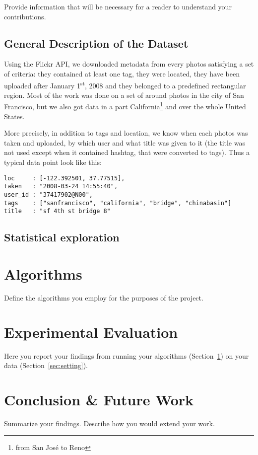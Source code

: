 Provide information that will be necessary for a reader to understand your contributions.

\subsection{General Description of the Dataset}

Using the Flickr API, we downloaded metadata from every photos satisfying a
set of criteria: they contained at least one tag, they were located, they have
been uploaded after January 1\textsuperscript{st}, 2008 and they belonged to a
predefined rectangular region. Most of the work was done on a set of around
 photos in the city of San Francisco, but we also got data in
a part California\footnote{from San José to Reno} and over the whole United
States.

More precisely, in addition to tags and location, we know when each photos was
taken and uploaded, by which user and what title was given to it (the title
was not used except when it contained hashtag, that were converted to tags).
Thus a typical data point look like this:

\vspace{\baselineskip}
{\centering\begin{minipage}{0.7\linewidth}
  \begin{Verbatim}[frame=none, gobble=0]
loc     : [-122.392501, 37.77515],
taken   : "2008-03-24 14:55:40",
user_id : "37417902@N00",
tags    : ["sanfrancisco", "california", "bridge", "chinabasin"]
title   : "sf 4th st bridge 8"
  \end{Verbatim}
\end{minipage}\par}



\subsection{Statistical exploration}

\section{Algorithms}
\label{sec:algorithms}

Define the algorithms you employ for the purposes of the project.

\section{Experimental Evaluation}

Here you report your findings from running your algorithms
(Section~\ref{sec:algorithms}) on your data (Section~\ref{sec:setting}).

\section{Conclusion \& Future Work}

\balance{}
Summarize your findings. Describe how you would extend your work.
